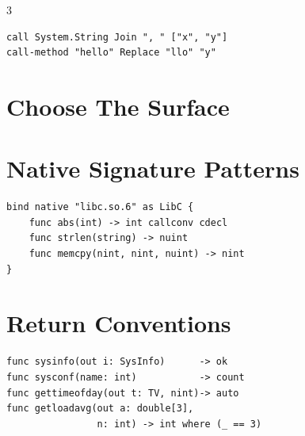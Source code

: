 \begin{multicols*}{3}
\begin{lstlisting}
call System.String Join ", " ["x", "y"]
call-method "hello" Replace "llo" "y"
\end{lstlisting}

\section{Choose The Surface}

\columnbreak

\section{Native Signature Patterns}
\begin{lstlisting}
bind native "libc.so.6" as LibC {
    func abs(int) -> int callconv cdecl
    func strlen(string) -> nuint
    func memcpy(nint, nint, nuint) -> nint
}
\end{lstlisting}


\section{Return Conventions}
\begin{lstlisting}
func sysinfo(out i: SysInfo)      -> ok
func sysconf(name: int)           -> count
func gettimeofday(out t: TV, nint)-> auto
func getloadavg(out a: double[3],
                n: int) -> int where (_ == 3)
\end{lstlisting}


\end{multicols*}
